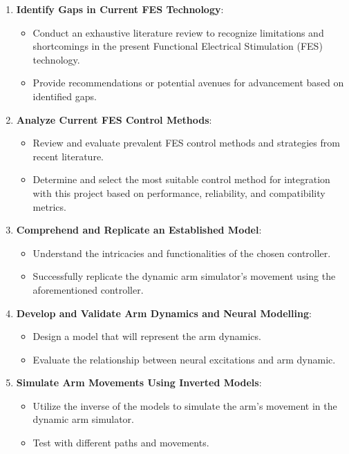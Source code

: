 \begin{enumerate}

    \item \textbf{Identify Gaps in Current FES Technology}:
    \begin{itemize}
        \item Conduct an exhaustive literature review to recognize limitations and shortcomings in the present Functional Electrical Stimulation (FES) technology.
        \item Provide recommendations or potential avenues for advancement based on identified gaps.
    \end{itemize}
    
      \item \textbf{Analyze Current FES Control Methods}:
    \begin{itemize}
        \item Review and evaluate prevalent FES control methods and strategies from recent literature.
        \item Determine and select the most suitable control method for integration with this project based on performance, reliability, and compatibility metrics.
    \end{itemize}
    
    \item \textbf{Comprehend and Replicate an Established Model}:
    \begin{itemize}
        \item Understand the intricacies and functionalities of the chosen controller.
        \item Successfully replicate the dynamic arm simulator's movement using the aforementioned controller.
    \end{itemize}

    \item \textbf{Develop and Validate Arm Dynamics and Neural Modelling}:
    \begin{itemize}
        \item Design a model that will represent the arm dynamics.
        \item Evaluate the relationship between neural excitations and arm dynamic.
    \end{itemize}
    
    \item \textbf{Simulate Arm Movements Using Inverted Models}:
    \begin{itemize}
        \item Utilize the inverse of the models to simulate the arm's movement in the dynamic arm simulator.
        \item Test with different paths and movements.
    \end{itemize}
    

\end{enumerate}
